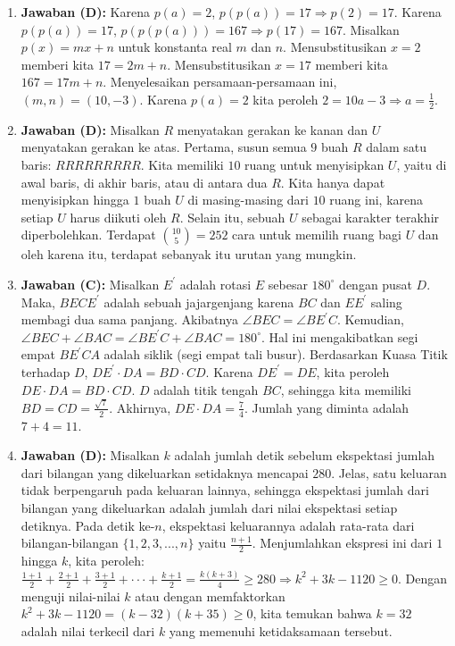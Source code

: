 \documentclass[12pt]{scrartcl}
\begin{document}
\begin{enumerate}
\item \textbf{Jawaban (D):} Karena $p(a)=2$, $p(p(a))=17\Rightarrow p(2)=17$. Karena $p(p(a))=17$, $p(p(p(a)))=167\Rightarrow p(17)=167$. Misalkan $p(x)=mx+n$ untuk konstanta real $m$ dan $n$. Mensubstitusikan $x=2$ memberi kita $17=2m+n$. Mensubstitusikan $x=17$ memberi kita $167=17m+n$. Menyelesaikan persamaan-persamaan ini, $(m,n)=(10,-3)$. Karena $p(a)=2$ kita peroleh $2=10a-3\Rightarrow a=\frac{1}{2}$.

\item \textbf{Jawaban (D):} Misalkan $R$ menyatakan gerakan ke kanan dan $U$ menyatakan gerakan ke atas. Pertama, susun semua $9$ buah $R$ dalam satu baris: $RRRRRRRRR$. Kita memiliki $10$ ruang untuk menyisipkan $U$, yaitu di awal baris, di akhir baris, atau di antara dua $R$. Kita hanya dapat menyisipkan hingga $1$ buah $U$ di masing-masing dari $10$ ruang ini, karena setiap $U$ harus diikuti oleh $R$. Selain itu, sebuah $U$ sebagai karakter terakhir diperbolehkan. Terdapat $\binom{10}{5}=252$ cara untuk memilih ruang bagi $U$ dan oleh karena itu, terdapat sebanyak itu urutan yang mungkin.

\item \textbf{Jawaban (C):} Misalkan $E^{\prime}$ adalah rotasi $E$ sebesar $180^{\circ}$ dengan pusat $D$. Maka, $BECE^{\prime}$ adalah sebuah jajargenjang karena $BC$ dan $EE^{\prime}$ saling membagi dua sama panjang. Akibatnya $\angle BEC=\angle BE^{\prime}C$. Kemudian, $\angle BEC+\angle BAC=\angle BE^{\prime}C+\angle BAC=180^{\circ}$. Hal ini mengakibatkan segi empat $BE^{\prime}CA$ adalah siklik (segi empat tali busur). Berdasarkan Kuasa Titik terhadap $D$, $DE^{\prime}\cdot DA=BD\cdot CD$. Karena $DE^{\prime}=DE$, kita peroleh $DE\cdot DA=BD\cdot CD$. $D$ adalah titik tengah $BC$, sehingga kita memiliki $BD=CD=\frac{\sqrt{7}}{2}$. Akhirnya, $DE\cdot DA=\frac{7}{4}$. Jumlah yang diminta adalah $7+4=11$.

\item \textbf{Jawaban (D):} Misalkan $k$ adalah jumlah detik sebelum ekspektasi jumlah dari bilangan yang dikeluarkan setidaknya mencapai $280$. Jelas, satu keluaran tidak berpengaruh pada keluaran lainnya, sehingga ekspektasi jumlah dari bilangan yang dikeluarkan adalah jumlah dari nilai ekspektasi setiap detiknya. Pada detik ke-$n$, ekspektasi keluarannya adalah rata-rata dari bilangan-bilangan $\{1,2,3,..., n\}$ yaitu $\frac{n+1}{2}$. Menjumlahkan ekspresi ini dari $1$ hingga $k$, kita peroleh: $\frac{1+1}{2}+\frac{2+1}{2}+\frac{3+1}{2}+\cdot\cdot\cdot+\frac{k+1}{2}=\frac{k(k+3)}{4}\ge280\Rightarrow k^{2}+3k-1120\ge0$. Dengan menguji nilai-nilai $k$ atau dengan memfaktorkan $k^{2}+3k-1120=(k-32)(k+35)\ge0$, kita temukan bahwa $k=32$ adalah nilai terkecil dari $k$ yang memenuhi ketidaksamaan tersebut.


\end{enumerate}
\end{document}
